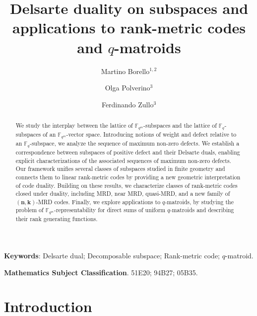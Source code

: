 \documentclass[11pt]{amsart}
\title{Delsarte duality on subspaces and applications to rank-metric codes and $q$-matroids}
\author{Martino Borello$^{1,2}$}
\author{Olga Polverino$^3$}
\author{Ferdinando Zullo$^3$}
\begin{document}
\maketitle

\begin{abstract}
We study the interplay between the lattice of $\mathbb{F}_{q^m}$-subspaces and the lattice of $\mathbb{F}_q$-subspaces of an $\mathbb{F}_{q^m}$-vector space. Introducing notions of weight and defect relative to an $\mathbb{F}_q$-subspace, we analyze the sequence of maximum non-zero defects. 
We establish a correspondence between subspaces of positive  defect and their Delsarte duals, enabling explicit characterizations of the associated sequences of maximum non-zero defects. Our framework unifies several classes of subspaces studied in finite geometry and connects them to linear rank-metric codes by providing a new geometric interpretation of code duality.
Building on these results, we characterize classes of rank-metric codes closed under duality, including MRD, near MRD, quasi-MRD, and a new family of $(\mathbf{n}, \mathbf{k})$-MRD codes. Finally, we explore applications to $q$-matroids, by studying the problem of $\mathbb{F}_{q^m}$-representability for direct sums of uniform $q$-matroids and describing their rank generating functions.
\end{abstract}

\textbf{Keywords}: Delsarte dual; Decomposable subspace; Rank-metric code; $q$-matroid.

\textbf{Mathematics Subject Classification}. 51E20;   94B27; 05B35.

\tableofcontents


\bigskip

\section*{Introduction}
\end{document}
